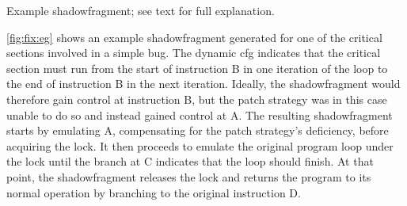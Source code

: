 \begin{sanefig}
{
    \label{fig:fix:eg:shadow}
  }
  {\hfill}
  \caption{Example \protect\gls{shadowfragment}; see text for full
    explanation.}
  \label{fig:fix:eg}
\end{sanefig}

\autoref{fig:fix:eg} shows an example \gls{shadowfragment} generated
for one of the critical sections involved in a simple bug.  The
\gls{dynamic cfg} indicates that the critical section must run from
the start of instruction B in one iteration of the loop to the end of
instruction B in the next iteration.  Ideally, the
\gls{shadowfragment} would therefore gain control at instruction B,
but the patch strategy was in this case unable to do so and instead
gained control at A.  The resulting \gls{shadowfragment} starts by
emulating A, compensating for the patch strategy's deficiency, before
acquiring the lock.  It then proceeds to emulate the original program
loop under the lock until the branch at C indicates that the loop
should finish.  At that point, the \gls{shadowfragment} releases the
lock and returns the program to its normal operation by branching to
the original instruction D.


